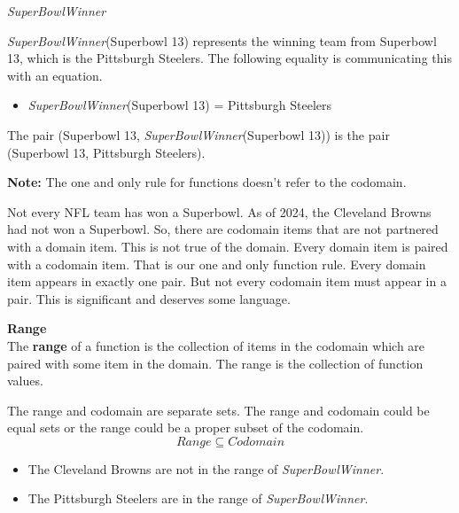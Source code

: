 \documentclass{ximera}
\begin{document}
\begin{example} \textit{SuperBowlWinner}


\textit{SuperBowlWinner}(Superbowl 13) represents the winning team from Superbowl 13, which is the Pittsburgh Steelers.  The following equality is communicating this with an equation.

\begin{itemize}
\item \textit{SuperBowlWinner}(Superbowl 13) = Pittsburgh Steelers  
\end{itemize}



The pair (Superbowl 13, \textit{SuperBowlWinner}(Superbowl 13)) is the pair (Superbowl 13, Pittsburgh Steelers). \

\end{example}

\textbf{Note:} The one and only rule for functions doesn't refer to the codomain.

Not every NFL team has won a Superbowl. As of 2024, the Cleveland Browns had not won a Superbowl.  So, there are codomain items that are not partnered with a domain item.  This is not true of the domain.  Every domain item is paired with a codomain item.  That is our one and only function rule.  Every domain item appears in exactly one pair.  But not every codomain item must appear in a pair.  This is significant and deserves some language.


\begin{definition} \textbf{\textcolor{green!50!black}{Range}} \\

The \textbf{range} of a function is the collection of items in the codomain which are paired with some item in the domain.  The range is the collection of function values.
\end{definition}

The range and codomain are separate sets.  The range and codomain could be equal sets or the range could be a proper subset of the codomain. \\

\[  Range \subseteq Codomain\]

\begin{itemize}
\item The Cleveland Browns are not in the range of \textit{SuperBowlWinner}.  
\item The Pittsburgh Steelers are in the range of \textit{SuperBowlWinner}.
\end{itemize}
\end{document}

